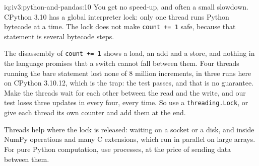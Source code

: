 \begin{solution}{iq:iv3:python-and-pandas:10}
You get no speed-up, and often a small slowdown. CPython 3.10 has a global interpreter lock: only one thread runs Python bytecode at a time. The lock does not make \texttt{count += 1} safe, because that statement is several bytecode steps.

The disassembly of \texttt{count += 1} shows a load, an add and a store, and nothing in the language promises that a switch cannot fall between them. Four threads running the bare statement lost none of 8 million increments, in three runs here on CPython 3.10.12, which is the trap: the test passes, and that is no guarantee. Make the threads wait for each other between the read and the write, and our test loses three updates in every four, every time. So use a \texttt{threading.Lock}, or give each thread its own counter and add them at the end.

Threads help where the lock is released: waiting on a socket or a disk, and inside NumPy operations and many C extensions, which run in parallel on large arrays. For pure Python computation, use processes, at the price of sending data between them.

\end{solution}

